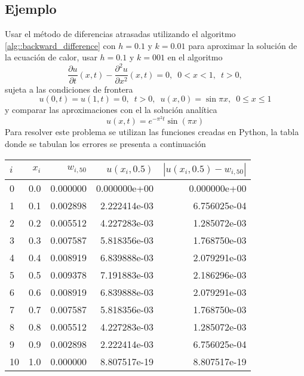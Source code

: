 \documentclass[a4paper]{article}
\begin{document}
\subsection{Ejemplo}
Usar el método de diferencias atrasadas utilizando el algoritmo \ref{alg::backward_difference} con $h=0.1$ y $k=0.01$ para aproximar la solución de la ecuación de calor, usar $h=0.1$ y $k=001$ en el algoritmo
\begin{equation}
\frac{\partial u}{\partial t}(x,t) -\frac{\partial^2 u}{\partial x ^2}(x,t)=0, \,\,\, 0<x<1,\,\,\, t>0,
\end{equation}
sujeta a las condiciones de frontera
\begin{equation*}
u(0,t)=u(1,t)=0,\,\,\, t>0,\,\,\,u(x,0)=\sin{\pi x},\,\,\, 0\leq x \leq 1
\end{equation*}
y comparar las aproximaciones con el la solución analítica
\begin{equation}
u(x,t)=e^{-\pi^2 t}\sin{(\pi x)}
\end{equation}
Para  resolver este problema se utilizan las funciones creadas en Python, la tabla donde se tabulan los errores se presenta a continuación\\
\begin{tabular}{lrrrr}
\toprule
$i$ &  $x_i$ &    $w_{i,50}$ &    $u(x_i,0.5)$ &  $|u(x_i,0.5)-w_{i,50}|$ \\
\midrule
0  &  0.0 &  0.000000 &  0.000000e+00 &         0.000000e+00 \\
1  &  0.1 &  0.002898 &  2.222414e-03 &         6.756025e-04 \\
2  &  0.2 &  0.005512 &  4.227283e-03 &         1.285072e-03 \\
3  &  0.3 &  0.007587 &  5.818356e-03 &         1.768750e-03 \\
4  &  0.4 &  0.008919 &  6.839888e-03 &         2.079291e-03 \\
5  &  0.5 &  0.009378 &  7.191883e-03 &         2.186296e-03 \\
6  &  0.6 &  0.008919 &  6.839888e-03 &         2.079291e-03 \\
7  &  0.7 &  0.007587 &  5.818356e-03 &         1.768750e-03 \\
8  &  0.8 &  0.005512 &  4.227283e-03 &         1.285072e-03 \\
9  &  0.9 &  0.002898 &  2.222414e-03 &         6.756025e-04 \\
10 &  1.0 &  0.000000 &  8.807517e-19 &         8.807517e-19 \\
\bottomrule
\end{tabular}
\end{document}
